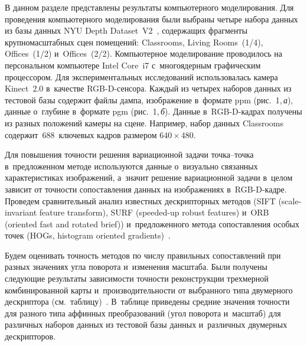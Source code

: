 \begin{multicols}{2}
  В данном разделе представлены результаты компьютерного моделирования. 
Для проведения компьютерного моделирования были выбраны четыре набора 
данных из базы данных NYU Depth Dataset~V2~\cite{18-voh, 19-voh}, 
содержащих фрагменты крупномасштабных сцен помещений: Classrooms, 
Living Rooms~(1/4), Offices~(1/2) и~Offices~(2/2). Компьютерное моделирование 
проводилось на персональном компьютере Intel Core~i7 с~многоядерным 
графическим процессором. Для экспериментальных исследований 
использовалась камера Kinect~2.0 в~качестве RGB-D-сен\-со\-ра. Каждый из 
четырех наборов данных из тестовой базы содержит файлы дампа, изображение 
в~формате ppm (рис.~1,\,\textit{а}), данные о~глубине в~формате pgm 
(рис.~1,\,\textit{б}). Данные в~RGB-D-кад\-рах получены из разных положений 
камеры на сцене. Например, набор данных Classrooms содержит~688~ключевых 
кад\-ров размером $640\times 480$.
  

  
  Для повышения точности решения вариационной задачи точка--точка 
в~предложенном методе используются данные о~визуально связанных 
характеристиках изображений, а~значит решение вариационной задачи в~целом 
зависит от точности сопоставления данных на изображениях в~RGB-D-кад\-ре. 
Проведем сравнительный анализ известных дескрипторных методов (SIFT
(scale-invariant feature transform), 
SURF (speeded-up robust features) и~ORB (oriented fast and rotated brief)) 
и~предложенного метода со\-по\-став\-ле\-ния особых точек 
(HOGs, histogram oriented gradients)~\cite{15-voh, 16-voh}. 

Будем оценивать точность методов по чис\-лу 
правильных сопоставлений при разных значениях угла поворота и~изменения 
мас\-шта\-ба. Были получены следующие результаты зависимости точности 
реконструкции трехмерной комбинированной карты и~производительности от 
выбранного типа двумерного дескриптора (см.\ таб\-ли\-цу)~\cite{20-voh}. 
В~таб\-ли\-це приведены средние значения точности для разного типа аффинных 
преобразований (угол поворота и~масштаб) для различных наборов данных из 
тес\-то\-вой базы данных и~различных двумерных дескрипторов.
  

\end{multicols}
